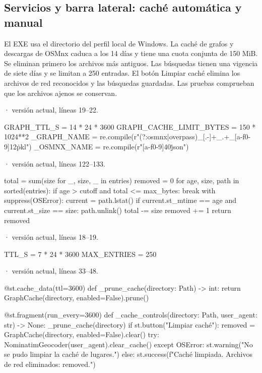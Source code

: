 \documentclass[11pt,a4paper]{article}
\begin{document}
\subsection{Servicios y barra lateral: caché automática y manual}
El EXE usa el directorio del perfil local de Windows. La caché de grafos y descargas de OSMnx caduca a los 14 días y tiene una cuota conjunta de 150 MiB. Se eliminan primero los archivos más antiguos. Las búsquedas tienen una vigencia de siete días y se limitan a 250 entradas. El botón Limpiar caché elimina los archivos de red reconocidos y las búsquedas guardadas. Las pruebas comprueban que los archivos ajenos se conservan.

\smallskip
{\footnotesize\texttt{} · versión actual, líneas 19--22.}\par
\begin{Codigo}[firstnumber=19]
GRAPH_TTL_S = 14 * 24 * 3600
GRAPH_CACHE_LIMIT_BYTES = 150 * 1024**2
_GRAPH_NAME = re.compile(r"(?:osmnx|overpass)_[\w.-]+_.+_[a-f0-9]{12}\.pkl")
_OSMNX_NAME = re.compile(r"[a-f0-9]{40}\.json")
\end{Codigo}

\smallskip
{\footnotesize\texttt{} · versión actual, líneas 122--133.}\par
\begin{Codigo}[firstnumber=122]
        total = sum(size for _, size, _ in entries)
        removed = 0
        for age, size, path in sorted(entries):
            if age > cutoff and total <= max_bytes:
                break
            with suppress(OSError):
                current = path.lstat()
                if current.st_mtime == age and current.st_size == size:
                    path.unlink()
                    total -= size
                    removed += 1
        return removed
\end{Codigo}

\smallskip
{\footnotesize\texttt{} · versión actual, líneas 18--19.}\par
\begin{Codigo}[firstnumber=18]
TTL_S = 7 * 24 * 3600
MAX_ENTRIES = 250
\end{Codigo}

\smallskip
{\footnotesize\texttt{} · versión actual, líneas 33--48.}\par
\begin{Codigo}[firstnumber=33]
@st.cache_data(ttl=3600)
def _prune_cache(directory: Path) -> int:
    return GraphCache(directory, enabled=False).prune()


@st.fragment(run_every=3600)
def _cache_controls(directory: Path, user_agent: str) -> None:
    _prune_cache(directory)
    if st.button("Limpiar caché"):
        removed = GraphCache(directory, enabled=False).clear()
        try:
            NominatimGeocoder(user_agent).clear_cache()
        except OSError:
            st.warning("No se pudo limpiar la caché de lugares.")
        else:
            st.success(f"Caché limpiada. Archivos de red eliminados: {removed}.")
\end{Codigo}
\end{document}
